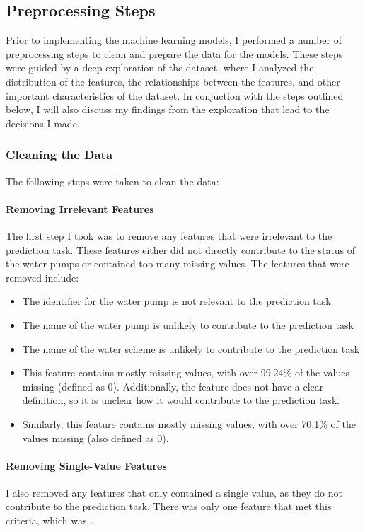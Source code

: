 \documentclass{article}
\begin{document}
\subsection{Preprocessing Steps}
Prior to implementing the machine learning models, I performed a number of preprocessing steps to clean and prepare the data for the models. These steps were guided by a deep exploration of the dataset, where I analyzed the distribution of the features, the relationships between the features, and other important characteristics of the dataset. In conjuction with the steps outlined below, I will also discuss my findings from the exploration that lead to the decisions I made.

\subsubsection{Cleaning the Data}
The following steps were taken to clean the data:

\paragraph{Removing Irrelevant Features}
The first step I took was to remove any features that were irrelevant to the prediction task. These features either did not directly contribute to the status of the water pumps or contained too many missing values. The features that were removed include:

\begin{itemize}
  \item {} The identifier for the water pump is not relevant to the prediction task
  \item {} The name of the water pump is unlikely to contribute to the prediction task
  \item {} The name of the water scheme is unlikely to contribute to the prediction task
  \item {} This feature contains mostly missing values, with over 99.24\% of the values missing (defined as 0). Additionally, the feature does not have a clear definition, so it is unclear how it would contribute to the prediction task.
  \item {} Similarly, this feature contains mostly missing values, with over 70.1\% of the values missing (also defined as 0). 
\end{itemize}

\paragraph{Removing Single-Value Features}
I also removed any features that only contained a single value, as they do not contribute to the prediction task. There was only one feature that met this criteria, which was .
\end{document}
